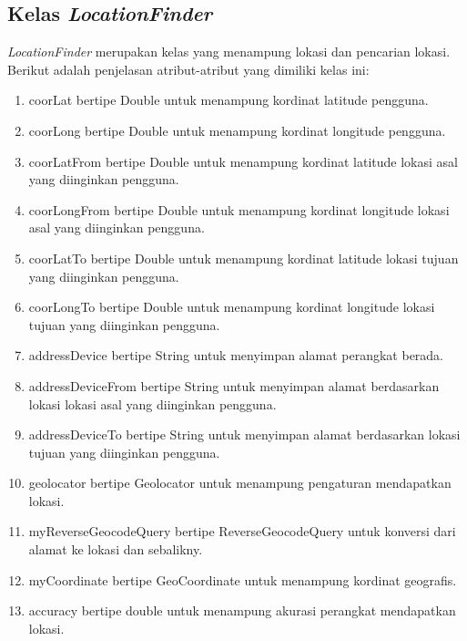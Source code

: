 \subsection{Kelas \textit{LocationFinder}}
\label{lab:Kelas LocationFinder}
\hspace{0.5cm} \textit{LocationFinder} merupakan kelas yang menampung lokasi dan pencarian lokasi. Berikut adalah penjelasan atribut-atribut yang dimiliki kelas ini:
\begin{enumerate}
	\item coorLat bertipe Double untuk menampung kordinat latitude pengguna.
	\item coorLong bertipe Double untuk menampung kordinat longitude pengguna.
	\item coorLatFrom bertipe Double untuk menampung kordinat latitude lokasi asal yang diinginkan pengguna.
	\item coorLongFrom bertipe Double untuk menampung kordinat longitude lokasi asal yang diinginkan pengguna.
	\item coorLatTo bertipe Double untuk menampung kordinat latitude lokasi tujuan yang diinginkan pengguna.
	\item coorLongTo bertipe Double untuk menampung kordinat longitude lokasi tujuan yang diinginkan pengguna.
	
	\item addressDevice bertipe String untuk menyimpan alamat perangkat berada.
	\item addressDeviceFrom bertipe String untuk menyimpan alamat berdasarkan lokasi lokasi asal yang diinginkan pengguna.
	\item addressDeviceTo bertipe String untuk menyimpan alamat berdasarkan lokasi tujuan yang diinginkan pengguna.
	
	\item geolocator bertipe Geolocator untuk menampung pengaturan mendapatkan lokasi.
	\item myReverseGeocodeQuery bertipe ReverseGeocodeQuery untuk konversi dari alamat ke lokasi dan sebalikny.
	\item myCoordinate bertipe GeoCoordinate untuk menampung kordinat geografis.
	\item accuracy bertipe double untuk menampung akurasi perangkat mendapatkan lokasi.
\end{enumerate}

